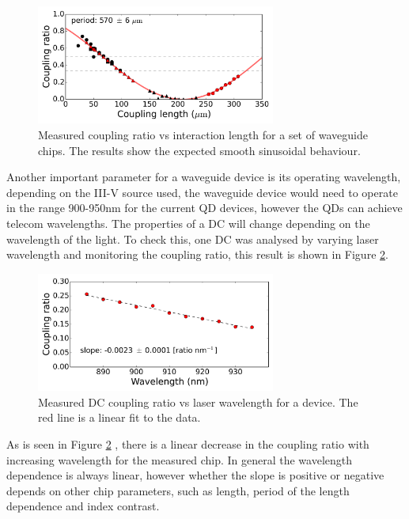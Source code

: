 \begin{figure}[h!] \begin{center}
\includegraphics[width=0.7\textwidth]{images/W008_DC_processing.png}
\caption{Measured coupling ratio vs interaction length for a set of waveguide
chips. The results show the expected smooth sinusoidal behaviour.}
\label{fig:dc_length} \end{center} \end{figure}

Another important parameter for a waveguide device is its operating wavelength,
depending on the III-V source used, the waveguide device would need to operate
in the range 900-950nm for the current QD devices, however the QDs can achieve
telecom wavelengths. The properties of a DC will change depending on the
wavelength of the light. To check this, one DC was analysed by varying laser
wavelength and monitoring the coupling ratio, this result is shown in Figure
\ref{fig:dc_wv}.

\begin{figure}[h!] \begin{center}
\includegraphics[width=0.7\textwidth]{images/W009C01_DV_WV_processing.png}
\caption{Measured DC coupling ratio vs laser wavelength for a device. The red
line is a linear fit to the data.} \label{fig:dc_wv} \end{center} \end{figure}

As is seen in Figure \ref{fig:dc_wv} , there is a linear decrease in the
coupling ratio with increasing wavelength for the measured chip. In general the
wavelength dependence is always linear, however whether the slope is positive or
negative depends on other chip parameters, such as length, period of the length
dependence and index contrast.

